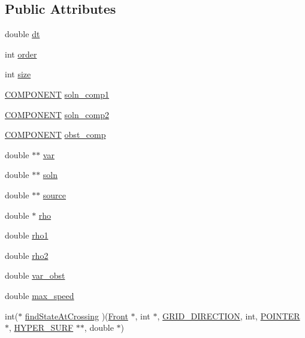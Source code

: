 \subsection*{Public Attributes}
\begin{DoxyCompactItemize}
\item 
double \hyperlink{class_h_y_p_e_r_b___s_o_l_v_e_r_a58f5ce0ca4a76775e89fe485b1195c5f}{dt}
\item 
int \hyperlink{class_h_y_p_e_r_b___s_o_l_v_e_r_a44f15c754ced06e1af599e8776dfe7ab}{order}
\item 
int \hyperlink{class_h_y_p_e_r_b___s_o_l_v_e_r_ae95ada870ad2afece2cf7e1d4e6a125f}{size}
\item 
\hyperlink{int_8h_a2bb7be12ca59ea6443c8757df0a7c278}{C\+O\+M\+P\+O\+N\+E\+NT} \hyperlink{class_h_y_p_e_r_b___s_o_l_v_e_r_a222aea9b77244ed816bce277d7f653cc}{soln\+\_\+comp1}
\item 
\hyperlink{int_8h_a2bb7be12ca59ea6443c8757df0a7c278}{C\+O\+M\+P\+O\+N\+E\+NT} \hyperlink{class_h_y_p_e_r_b___s_o_l_v_e_r_a84c8483be2ee1d4d64557ac26f7e7297}{soln\+\_\+comp2}
\item 
\hyperlink{int_8h_a2bb7be12ca59ea6443c8757df0a7c278}{C\+O\+M\+P\+O\+N\+E\+NT} \hyperlink{class_h_y_p_e_r_b___s_o_l_v_e_r_a30409e8ee4e07b93edfc82c1c861680f}{obst\+\_\+comp}
\item 
double $\ast$$\ast$ \hyperlink{class_h_y_p_e_r_b___s_o_l_v_e_r_ae09be12f2a6ba2ea90b89ec60f27bceb}{var}
\item 
double $\ast$$\ast$ \hyperlink{class_h_y_p_e_r_b___s_o_l_v_e_r_a0ad12bd0d6e8e24b44a45d56f48cc9eb}{soln}
\item 
double $\ast$$\ast$ \hyperlink{class_h_y_p_e_r_b___s_o_l_v_e_r_a66d8552a45d6147bd9c68306d9f6fd40}{source}
\item 
double $\ast$ \hyperlink{class_h_y_p_e_r_b___s_o_l_v_e_r_a2f143a167c6a86280073d5c386fe867b}{rho}
\item 
double \hyperlink{class_h_y_p_e_r_b___s_o_l_v_e_r_ad32d7c584c0642d113503c114a1ebc5a}{rho1}
\item 
double \hyperlink{class_h_y_p_e_r_b___s_o_l_v_e_r_a362b82cca13a3b350083744e59d532e4}{rho2}
\item 
double \hyperlink{class_h_y_p_e_r_b___s_o_l_v_e_r_a28ecbb9bbb2163ac76c453ab21155e17}{var\+\_\+obst}
\item 
double \hyperlink{class_h_y_p_e_r_b___s_o_l_v_e_r_ae2326bc3b32c8445a37abb04e63b0c4d}{max\+\_\+speed}
\item 
int($\ast$ \hyperlink{class_h_y_p_e_r_b___s_o_l_v_e_r_a82551cb2fc51081070bac3d8e3c27998}{find\+State\+At\+Crossing} )(\hyperlink{fdecs_8h_ac32202b798f848095c489cfd04c4ca5f}{Front} $\ast$, int $\ast$, \hyperlink{int_8h_aa7cc507beba6455174c0996f89fdc8c3}{G\+R\+I\+D\+\_\+\+D\+I\+R\+E\+C\+T\+I\+ON}, int, \hyperlink{cdecs_8h_ae51a81000f343b8ec43bca1f6a723d7b}{P\+O\+I\+N\+T\+ER} $\ast$, \hyperlink{int_8h_acef50fa4757ce0d3f75c97fab5a175bc}{H\+Y\+P\+E\+R\+\_\+\+S\+U\+RF} $\ast$$\ast$, double $\ast$)

\end{DoxyCompactItemize}

